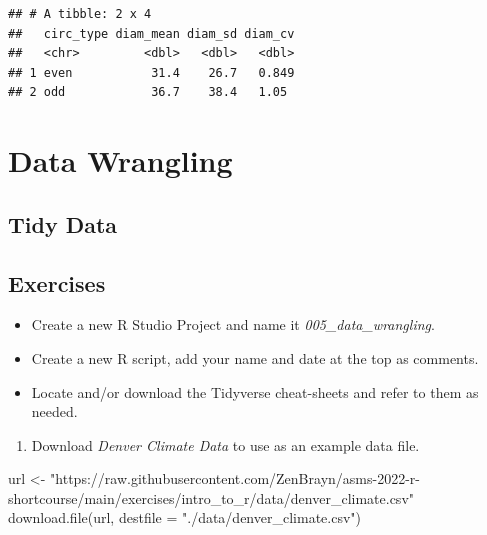 \documentclass[
]{book}
\newenvironment{Shaded}{\begin{snugshade}}{\end{snugshade}}
\newcommand{\AttributeTok}[1]{\textcolor[rgb]{0.77,0.63,0.00}{#1}}
\newcommand{\FunctionTok}[1]{\textcolor[rgb]{0.00,0.00,0.00}{#1}}
\newcommand{\NormalTok}[1]{#1}
\newcommand{\OtherTok}[1]{\textcolor[rgb]{0.56,0.35,0.01}{#1}}
\newcommand{\StringTok}[1]{\textcolor[rgb]{0.31,0.60,0.02}{#1}}
\providecommand{\tightlist}{%
  \setlength{\itemsep}{0pt}\setlength{\parskip}{0pt}}
\begin{document}
\begin{verbatim}
## # A tibble: 2 x 4
##   circ_type diam_mean diam_sd diam_cv
##   <chr>         <dbl>   <dbl>   <dbl>
## 1 even           31.4    26.7   0.849
## 2 odd            36.7    38.4   1.05
\end{verbatim}

\hypertarget{data-wrangling}{%
\chapter{Data Wrangling}\label{data-wrangling}}

\hypertarget{tidy-data}{%
\section{Tidy Data}\label{tidy-data}}

\hypertarget{exercises-4}{%
\section*{Exercises}\label{exercises-4}}

\begin{itemize}
\tightlist
\item
  Create a new R Studio Project and name it \emph{005\_data\_wrangling}.
\item
  Create a new R script, add your name and date at the top as comments.
\item
  Locate and/or download the Tidyverse cheat-sheets and refer to them as needed.
\end{itemize}

\begin{enumerate}
\def\labelenumi{\arabic{enumi}.}
\tightlist
\item
  Download \emph{Denver Climate Data} to use as an example data file.
\end{enumerate}

\begin{Shaded}
\begin{Highlighting}[]
\NormalTok{url }\OtherTok{\textless{}{-}} \StringTok{"https://raw.githubusercontent.com/ZenBrayn/asms{-}2022{-}r{-}shortcourse/main/exercises/intro\_to\_r/data/denver\_climate.csv"}
\FunctionTok{download.file}\NormalTok{(url, }\AttributeTok{destfile =} \StringTok{"./data/denver\_climate.csv"}\NormalTok{)}
\end{Highlighting}
\end{Shaded}
\end{document}
